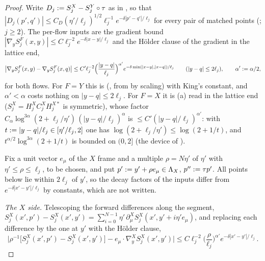 \begin{proof}
Write $D_j:= S^X_j-S^Y_j\circ\tau$ as in , so that $|D_j(p',q')|\le C_D(\eta'/\ell_j)^{1/2}\ell_j^{-1}e^{-\delta|p'-q'|/\ell_j}$ for every pair of matched points (; $j\ge2$). The per-flow inputs are the gradient bound $|\nabla_yS^F_j(x,y)|\le C\ell_j^{-2}e^{-\delta|x-y|/\ell_j}$ and the H\"older clause of the gradient in the lattice end,
\[
\big|\nabla_yS^F_j(x,y)-\nabla_yS^F_j(x,q)\big|\le C'\ell_j^{-2}\Big(\frac{|y-q|}{\ell_j}\Big)^{\alpha'}e^{-\delta\min(|x-y|,|x-q|)/\ell_j}\qquad(|y-q|\le2\ell_j),\qquad\alpha':=\alpha/2,
\]
for both flows. For $F=Y$ this is \cite[(3.63)]{K1} (\cite[Prop.~3.7]{K1}, from \cite[Thm.~3.3, (3.8)]{K1} by scaling) with King's constant, and $\alpha'<\alpha$ costs nothing on $|y-q|\le2\ell_j$. For $F=X$ it is (a) read in the lattice end ($S^X_j=H^X_jC^X_jH^{X*}_j$ is symmetric), whose factor $C_\alpha\log^{3\alpha}(2+\ell_j/\eta')\,(|y-q|/\ell_j)^{\alpha}$ is $\le C'(|y-q|/\ell_j)^{\alpha'}$: with $t:=|y-q|/\ell_j\in[\eta'/\ell_j,2]$ one has $\log(2+\ell_j/\eta')\le\log(2+1/t)$, and $t^{\alpha/2}\log^{3\alpha}(2+1/t)$ is bounded on $(0,2]$ (the device of ).

Fix a unit vector $e_\mu$ of the $X$ frame and a multiple $\rho=N\eta'$ of $\eta'$ with $\eta'\le\rho\le\ell_j$, to be chosen, and put $p':= y'+\rho e_\mu\in\Lambda_X$, $p'':=\tau p'$. All points below lie within $2\ell_j$ of $y'$, so the decay factors of the inputs differ from $e^{-\delta|x'-y'|/\ell_j}$ by constants, which are not written.

\emph{The $X$ side.} Telescoping the forward differences along the segment, $S^X_j(x',p')-S^X_j(x',y')=\sum_{i=0}^{N-1}\eta'\,\partial^X_\mu S^X_j(x',y'+i\eta'e_\mu)$, and replacing each difference by the one at $y'$ with the H\"older clause,
\[
\Big|\rho^{-1}\big[S^X_j(x',p')-S^X_j(x',y')\big]-e_\mu\cdot\nabla^X_yS^X_j(x',y')\Big|\le C\ell_j^{-2}\Big(\frac{\rho}{\ell_j}\Big)^{\alpha'}e^{-\delta|x'-y'|/\ell_j}.
\]


\end{proof}

